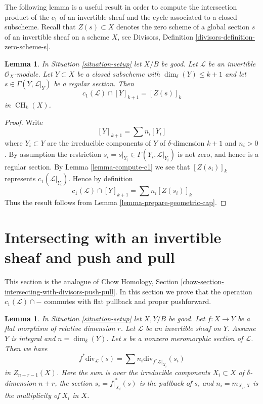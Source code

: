 \documentclass{stacks-project}
\theoremstyle{plain}
\newtheorem{lemma}[subsection]{Lemma}
\theoremstyle{definition}
\theoremstyle{remark}
\numberwithin{equation}{subsection}
\def\CH{\mathop{\mathrm{CH}}\nolimits}
\begin{document}
\noindent
The following lemma is a useful result in order to compute the intersection
product of the $c_1$ of an invertible sheaf and the cycle associated
to a closed subscheme.
Recall that $Z(s) \subset X$ denotes the zero scheme of a global section
$s$ of an invertible sheaf on a scheme $X$, see
Divisors, Definition \ref{divisors-definition-zero-scheme-s}.

\begin{lemma}
\label{lemma-geometric-cap}
In Situation \ref{situation-setup} let $X/B$ be good.
Let $\mathcal{L}$ be an invertible $\mathcal{O}_X$-module.
Let $Y \subset X$ be a closed subscheme with
$\dim_\delta(Y) \leq k + 1$ and let $s \in \Gamma(Y, \mathcal{L}|_Y)$
be a regular section. Then
$$
c_1(\mathcal{L}) \cap [Y]_{k + 1} = [Z(s)]_k
$$
in $\CH_k(X)$.
\end{lemma}

\begin{proof}
Write
$$
[Y]_{k + 1} = \sum n_i[Y_i]
$$
where $Y_i \subset Y$ are the irreducible components of
$Y$ of $\delta$-dimension $k + 1$ and $n_i > 0$.
By assumption the restriction
$s_i = s|_{Y_i} \in \Gamma(Y_i, \mathcal{L}|_{Y_i})$ is not
zero, and hence is a regular section. By Lemma \ref{lemma-compute-c1}
we see that $[Z(s_i)]_k$ represents $c_1(\mathcal{L}|_{Y_i})$.
Hence by definition
$$
c_1(\mathcal{L}) \cap [Y]_{k + 1} = \sum n_i[Z(s_i)]_k
$$
Thus the result follows from Lemma \ref{lemma-prepare-geometric-cap}.
\end{proof}









\section{Intersecting with an invertible sheaf and push and pull}
\label{section-intersecting-with-divisors-push-pull}

\noindent
This section is the analogue of
Chow Homology, Section \ref{chow-section-intersecting-with-divisors-push-pull}.
In this section we prove that the operation $c_1(\mathcal{L}) \cap -$
commutes with flat pullback and proper pushforward.

\begin{lemma}
\label{lemma-prepare-flat-pullback-cap-c1}
In Situation \ref{situation-setup} let $X, Y/B$ be good.
Let $f : X \to Y$ be a flat morphism of relative dimension $r$.
Let $\mathcal{L}$ be an invertible sheaf on $Y$.
Assume $Y$ is integral and $n = \dim_\delta(Y)$.
Let $s$ be a nonzero meromorphic section of $\mathcal{L}$.
Then we have
$$
f^*\text{div}_\mathcal{L}(s) = \sum n_i\text{div}_{f^*\mathcal{L}|_{X_i}}(s_i)
$$
in $Z_{n + r - 1}(X)$. Here the sum is over the irreducible
components $X_i \subset X$ of $\delta$-dimension $n + r$,
the section $s_i = f|_{X_i}^*(s)$ is the pullback of $s$, and
$n_i = m_{X_i, X}$ is the multiplicity of $X_i$ in $X$.
\end{lemma}
\end{document}

